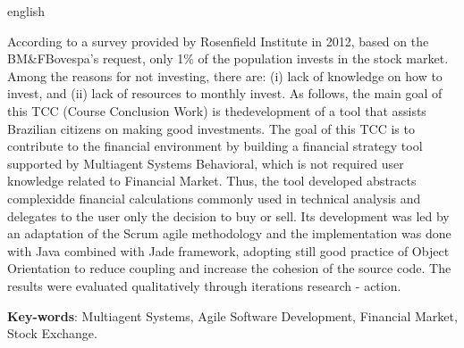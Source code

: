 \begin{resumo}[Abstract]
 \begin{otherlanguage*}{english}
   
   According to a survey provided by Rosenfield Institute in 2012, based on the BM\&FBovespa's request, only 1\% of the population invests in the stock market. Among the reasons for not investing, there are: (i) lack of knowledge on how to invest, and (ii) lack of resources to monthly invest. As follows, the main goal of this TCC (Course Conclusion Work) is thedevelopment of a tool that assists Brazilian citizens on making good investments. The goal of this TCC is to contribute to the financial environment by building a financial strategy tool supported by Multiagent Systems Behavioral, which is not required user knowledge related to Financial Market. Thus, the tool developed abstracts complexidde financial calculations commonly used in technical analysis and delegates to the user only the decision to buy or sell. Its development was led by an adaptation of the Scrum agile methodology and the implementation was done with Java combined with Jade framework, adopting still good practice of Object Orientation to reduce coupling and increase the cohesion of the source code. The results were evaluated qualitatively through iterations research - action.


   \vspace{\onelineskip}
 
   \noindent 
   \textbf{Key-words}: Multiagent Systems, Agile Software Development, Financial Market, Stock Exchange.
 \end{otherlanguage*}
\end{resumo}
